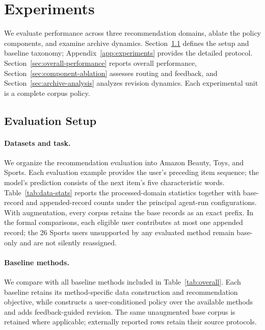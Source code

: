\section{Experiments}
\label{sec:experiments}

We evaluate performance across three recommendation domains, ablate the policy components, and examine archive dynamics. Section~\ref{sec:exp-setup} defines the setup and baseline taxonomy; Appendix~\ref{app:experiments} provides the detailed protocol. Section~\ref{sec:overall-performance} reports overall performance, Section~\ref{sec:component-ablation} assesses routing and feedback, and Section~\ref{sec:archive-analysis} analyzes revision dynamics. Each experimental unit is a complete corpus policy.

\subsection{Evaluation Setup}
\label{sec:exp-setup}

\paragraph{Datasets and task.}
We organize the recommendation evaluation into Amazon Beauty, Toys, and Sports.
Each evaluation example provides the user's preceding item sequence; the model's prediction consists of the next item's five characteristic words.
Table~\ref{tab:data-stats} reports the processed-domain statistics together with base-record and appended-record counts under the principal agent-run configurations.
With augmentation, every corpus retains the base records as an exact prefix.
In the formal comparisons, each eligible user contributes at most one appended record; the 26 Sports users unsupported by any evaluated method remain base-only and are not silently reassigned.

\paragraph{Baseline methods.}
We compare \method{} with all baseline methods included in Table~\ref{tab:overall}. Each baseline retains its method-specific data construction and recommendation objective, while \method{} constructs a user-conditioned policy over the available methods and adds feedback-guided revision. The same unaugmented base corpus is retained where applicable; externally reported rows retain their source protocols.

